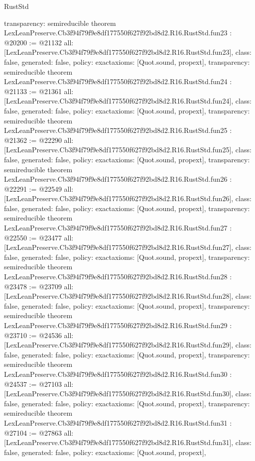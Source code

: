 \begin{lexlean}{RustStd}
\begin{coremodule}
{  transparency: semireducible
}
theorem LexLeanPreserve.Cb3f94f79f9e8df177550f627f92bd8d2.R16.RustStd.fun23 : @20200 := @21132 {
  all: [LexLeanPreserve.Cb3f94f79f9e8df177550f627f92bd8d2.R16.RustStd.fun23],
  class: false,
  generated: false,
  policy: exact{axioms: [Quot.sound, propext]},
  transparency: semireducible
}
theorem LexLeanPreserve.Cb3f94f79f9e8df177550f627f92bd8d2.R16.RustStd.fun24 : @21133 := @21361 {
  all: [LexLeanPreserve.Cb3f94f79f9e8df177550f627f92bd8d2.R16.RustStd.fun24],
  class: false,
  generated: false,
  policy: exact{axioms: [Quot.sound, propext]},
  transparency: semireducible
}
theorem LexLeanPreserve.Cb3f94f79f9e8df177550f627f92bd8d2.R16.RustStd.fun25 : @21362 := @22290 {
  all: [LexLeanPreserve.Cb3f94f79f9e8df177550f627f92bd8d2.R16.RustStd.fun25],
  class: false,
  generated: false,
  policy: exact{axioms: [Quot.sound, propext]},
  transparency: semireducible
}
theorem LexLeanPreserve.Cb3f94f79f9e8df177550f627f92bd8d2.R16.RustStd.fun26 : @22291 := @22549 {
  all: [LexLeanPreserve.Cb3f94f79f9e8df177550f627f92bd8d2.R16.RustStd.fun26],
  class: false,
  generated: false,
  policy: exact{axioms: [Quot.sound, propext]},
  transparency: semireducible
}
theorem LexLeanPreserve.Cb3f94f79f9e8df177550f627f92bd8d2.R16.RustStd.fun27 : @22550 := @23477 {
  all: [LexLeanPreserve.Cb3f94f79f9e8df177550f627f92bd8d2.R16.RustStd.fun27],
  class: false,
  generated: false,
  policy: exact{axioms: [Quot.sound, propext]},
  transparency: semireducible
}
theorem LexLeanPreserve.Cb3f94f79f9e8df177550f627f92bd8d2.R16.RustStd.fun28 : @23478 := @23709 {
  all: [LexLeanPreserve.Cb3f94f79f9e8df177550f627f92bd8d2.R16.RustStd.fun28],
  class: false,
  generated: false,
  policy: exact{axioms: [Quot.sound, propext]},
  transparency: semireducible
}
theorem LexLeanPreserve.Cb3f94f79f9e8df177550f627f92bd8d2.R16.RustStd.fun29 : @23710 := @24536 {
  all: [LexLeanPreserve.Cb3f94f79f9e8df177550f627f92bd8d2.R16.RustStd.fun29],
  class: false,
  generated: false,
  policy: exact{axioms: [Quot.sound, propext]},
  transparency: semireducible
}
theorem LexLeanPreserve.Cb3f94f79f9e8df177550f627f92bd8d2.R16.RustStd.fun30 : @24537 := @27103 {
  all: [LexLeanPreserve.Cb3f94f79f9e8df177550f627f92bd8d2.R16.RustStd.fun30],
  class: false,
  generated: false,
  policy: exact{axioms: [Quot.sound, propext]},
  transparency: semireducible
}
theorem LexLeanPreserve.Cb3f94f79f9e8df177550f627f92bd8d2.R16.RustStd.fun31 : @27104 := @27863 {
  all: [LexLeanPreserve.Cb3f94f79f9e8df177550f627f92bd8d2.R16.RustStd.fun31],
  class: false,
  generated: false,
  policy: exact{axioms: [Quot.sound, propext]},
}
\end{coremodule}
\end{lexlean}
